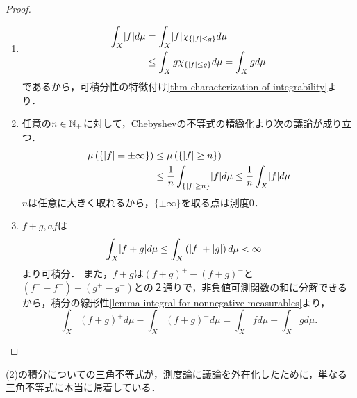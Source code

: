 \documentclass[uplatex, dvipdfmx]{jsreport}
\renewcommand{\B}{\mathcal{B}}
\begin{document}
\begin{proof}
\begin{enumerate}
        $\Rightarrow$は，
        $\forall_{A\in\B}\;\int_Afd\mu=0$が従うことからわかる．実際，任意の$A\in\B$に対して，(2)も使って，
        \begin{align*}
            \Abs{\iint_Afd\mu}&\le\int_A\abs{f}d\mu\le\int_X\abs{f}d\mu=0.
        \end{align*}
        \item 
        \begin{align*}
            \int_X\lvert f\rvert d\mu&=\int_X\lvert f\rvert\chi_{\{\lvert f\rvert\le g\}}d\mu\\
            &\le\int_Xg\chi_{\{\lvert f\rvert\le g\}}d\mu=\int_Xgd\mu
        \end{align*}
        であるから，可積分性の特徴付け\ref{thm-characterization-of-integrability}より．
        \item 任意の$n\in\mathbb{N}_+$に対して，Chebyshevの不等式の精緻化より次の議論が成り立つ．
        \begin{align*}
            \mu\left(\left\{\lvert f\rvert=\pm\infty\right\}\right)&\le\mu\left(\left\{\lvert f\rvert\ge n\right\}\right)\\
            &\le\frac{1}{n}\int_{\left\{\lvert f\rvert\ge n\right\}}\lvert f\rvert d\mu\le\frac{1}{n}\int_X\lvert f\rvert d\mu
        \end{align*}
        $n$は任意に大きく取れるから，$\{\pm\infty\}$を取る点は測度$0$．
        \item $f+g,af$は
        \begin{align*}
            \int_X\lvert f+g\rvert d\mu&\le\int_X\left(\lvert f\rvert+\lvert g\rvert\right)d\mu<\infty
        \end{align*}
        より可積分．
        また，$f+g$は$(f+g)^+-(f+g)^-$と$(f^+-f^-)+(g^+-g^-)$との２通りで，非負値可測関数の和に分解できるから，積分の線形性\ref{lemma-integral-for-nonnegative-measurables}より，
        \[\int_X(f+g)^+d\mu-\int_X(f+g)^-d\mu=\int_Xfd\mu+\int_Xgd\mu.\]
    \end{enumerate}
\end{proof}
\begin{remarks}
    (2)の積分についての三角不等式が，測度論に議論を外在化したために，単なる三角不等式に本当に帰着している．
\end{remarks}
\end{document}
